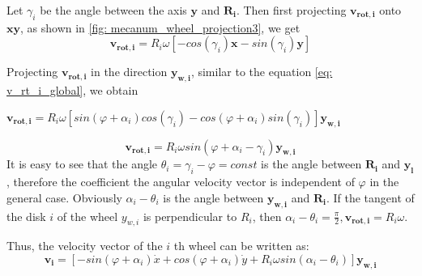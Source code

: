 \documentclass[oneside,final,14pt]{extreport}
\newcommand{\bs}{\boldsymbol}
\begin{document}
\begin{figure} [H]
\end{figure}

Let $ \gamma_{i} $ be the angle between the axis $ \bs{y} $ and $ \bs{R_{i}} $. Then first projecting $ \bs{v_{rot, i}} $ onto $ \bs{xy} $, as shown in \ref{fig: mecanum_wheel_projection3}, we get
\begin{equation}
\bs{v_{rot, i}}
=
R_{i}
\omega
[
-cos (\gamma_{i})
\bs{x}
-
sin (\gamma_{i})
\bs{y}
]
\end{equation}

Projecting $ \bs{v_{rot, i}} $ in the direction $ \bs{y_{w, i}} $, similar to the equation \ref{eq: v_rt_i_global}, we obtain
\begin{center}
$
\bs{v_{rot, i}}
=
R_{i}
\omega
[
sin (\varphi + \alpha_{i})
cos (\gamma_{i})
-
cos (\varphi + \alpha_{i})
sin (\gamma_{i})
]
\bs{y_{w, i}}
$
\end{center}
\begin{equation}
\bs{v_{rot, i}}
=
R_{i}
\omega
sin (\varphi + \alpha_{i} - \gamma_{i})
\bs{y_{w, i}}
\end{equation}
It is easy to see that the angle $ \theta_{i} = \gamma_{i} - \varphi = const $ is the angle between $ \bs{R_{i}} $ and $ \bs{y_{l}} $, therefore the coefficient the angular velocity vector is independent of $ \varphi $ in the general case. Obviously $ \alpha_{i} - \theta_{i} $ is the angle between $ \bs{y_{w, i}} $ and $ \bs{R_{i}} $. If the tangent of the disk $ i $ of the wheel $ y_{w, i} $ is perpendicular to $ R_{i} $, then $ \alpha_{i} - \theta_{i} = \frac{\pi}{2}, \bs{v_{rot, i}} = R_{i} \omega $.
\iffalse
 Also fair
\begin{gather}
\dot{x}
=
v_{x} \bs{x}
\\
\dot{y}
=
v_{y} \bs{y}
\\
\dot{\varphi}
=
\omega \bs{z}
\end{gather}
Where $ v_{x} $, $ v_{x} $, $ \omega $ is the velocity value in the direction of $ \bs{x} $ and $ \bs{y} $, respectively, $ \omega $ is the angular velocity value.
\fi

Thus, the velocity vector of the $ i $ th wheel can be written as:
\begin{equation}
\label{eq: local_v_global}
\bs{v_{i}}
=
[
-sin (\varphi + \alpha_{i}) \dot{x}
+ cos (\varphi + \alpha_{i}) \dot{y}
+
R_{i}
\omega
sin (\alpha_{i} - \theta_{i})
]
\bs{y_{w, i}}
\end{equation}
\end{document}
